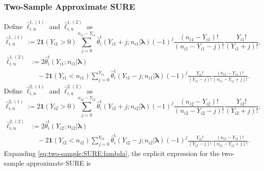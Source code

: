 \documentclass[12pt,letterpaper]{article}
\renewcommand{\u}{\mathrm{u}}
\begin{document}
\subsubsection{Two-Sample Approximate SURE}
Define $\hat{\ell}_{i, \u}^{1,(1)}$ and $\hat{\ell}_{i, \u}^{1,(2)}$ as
\begin{equation}
  \label{eq:ell_iu_1:sample1}
  \hat{\ell}_{i, \u}^{1,(1)}:=2\mathbf{1}(Y_{i1} > 0)\!\!\!\sum_{j=0}^{n_{i1}-Y_{i1}}\!\!\!\hat{\theta}_i^{\mathrm{t}}(Y_{i1} + j; n_{i1}|\boldsymbol{\lambda})(-1)^{j}\frac{(n_{i1}-Y_{i1})!}{(n_{i1}-Y_{i1}-j)!}\frac{Y_{i1}!}{(Y_{i1}+j)!},
\end{equation}
\begin{equation}
  \label{eq:ell_iu_2:sample1}
  \begin{array}{rl}
  \hat{\ell}_{i, \u}^{1,(2)} \!\!\!\!\!&\displaystyle := 2\hat{\theta}_i^{\mathrm{t}}(Y_{i1}; n_{i1}|\boldsymbol{\lambda})\\
  &\quad \displaystyle -2\mathbf{1}(Y_{i1} < {n_{i1}})\sum_{j=0}^{Y_{i1}}\hat{\theta}_i^{\mathrm{t}}(Y_{i1}-j; n_{i1}|\boldsymbol{\lambda})(-1)^{j}\frac{Y_{i1}!}{(Y_{i1}-j)!}\frac{(n_{i1} - Y_{i1})!}{(n_{i1}-Y_{i1}+j)!}.
\end{array}
\end{equation}
Define $\hat{\ell}_{i, \u}^{2,(1)}$ and $\hat{\ell}_{i, \u}^{2,(2)}$ as
\begin{equation}
  \label{eq:ell_iu_1:sample2}
  \hat{\ell}_{i, \u}^{2,(1)}:=2\mathbf{1}(Y_{i2} > 0)\!\!\!\sum_{j=0}^{n_{i2}-Y_{i2}}\!\!\hat{\theta}_i^{\mathrm{t}}(Y_{i2} + j; n_{i2}|\boldsymbol{\lambda})(-1)^{j}\frac{(n_{i2}-Y_{i2})!}{(n_{i2}-Y_{i2}-j)!}\frac{Y_{i2}!}{(Y_{i2}+j)!},
\end{equation}
\begin{equation}
  \label{eq:ell_iu_2:sample2}
  \begin{array}{rl}
  \hat{\ell}_{i, \u}^{2,(2)} \!\!\!\!\!&\displaystyle:= 2 \hat{\theta}_i^{\mathrm{t}}(Y_{i2}; n_{i2}|\boldsymbol{\lambda})\\
  &\quad \displaystyle -2\mathbf{1}(Y_{i2} < {n_{i2}})\sum_{j=0}^{Y_{i2}}\hat{\theta}_i^{\mathrm{t}}(Y_{i2}-j; n_{i2}|\boldsymbol{\lambda})(-1)^{j}\frac{Y_{i2}!}{(Y_{i2}-j)!}\frac{(n_{i2} - Y_{i2})!}{(n_{i2}-Y_{i2}+j)!}. 
  \end{array}
\end{equation}
Expanding \eqref{eq:two-sample:SURE:lambda}, the explicit expression for the two-sample approximate SURE is 
\end{document}
